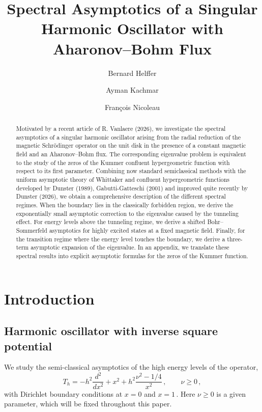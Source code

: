 \documentclass[11pt]{amsart}
\title[Singular harmonic oscillators with Aharonov--Bohm flux]
{Spectral Asymptotics of a Singular Harmonic Oscillator with Aharonov--Bohm Flux}
\author[B. Helffer]{Bernard Helffer}
\author[A. Kachmar]{Ayman Kachmar}
\author[F. Nicoleau]{Fran\c{c}ois Nicoleau}
\numberwithin{equation}{section}
\theoremstyle{remark}
\begin{document}
			
		


	
\begin{abstract}
Motivated by a recent article of R. Vanlaere (2026), we investigate the spectral asymptotics of a singular harmonic oscillator arising from the radial reduction of the magnetic Schrödinger operator on the unit disk in the presence of a constant magnetic field and an Aharonov–Bohm flux. The corresponding eigenvalue problem is equivalent to the study of the zeros of the Kummer confluent hypergeometric function with respect to its first parameter. Combining  now standard semiclassical methods with the uniform asymptotic theory of Whittaker and confluent hypergeometric functions  developed by Dunster (1989), Gabutti-Gatteschi (2001) and improved quite recently by Dunster (2026), we obtain a comprehensive description of the different spectral regimes. When the boundary lies in the classically forbidden region, we derive the exponentially small asymptotic correction to the eigenvalue caused by the tunneling effect. For energy levels above the tunneling regime, we derive a shifted Bohr–Sommerfeld asymptotics for highly excited states at a fixed magnetic field. Finally, for the transition regime where the energy level touches the boundary, we derive a three-term asymptotic expansion of the eigenvalue. In an appendix, we translate these spectral results into explicit asymptotic formulas for the zeros of the Kummer function.
\end{abstract}

\maketitle


%
\section{Introduction}
%
\subsection{Harmonic oscillator with inverse square potential}
We study the semi-classical asymptotics of the high energy levels of the operator, 
\begin{equation}\label{eq:def-Th}
T_h = -h^2 \frac{d^2}{dx^2} + x^2 + h^2 \frac{\nu^2 - 1/4}{x^2}\,, \qquad \nu \ge 0\,,
\end{equation}
with Dirichlet boundary conditions at \(x=0\) and \(x=1\)\,. Here $\nu\geq 0$ is a given parameter, which will be fixed throughout this paper. 
\end{document}
